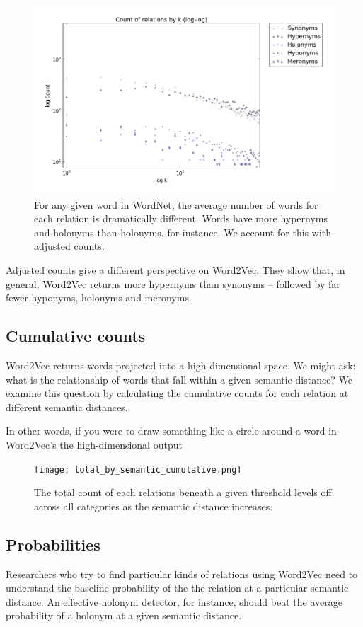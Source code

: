 \documentclass[titlepage]{article}
\begin{document}
\begin{figure}[!htbp]
  \includegraphics[scale=.5]{total_adjusted.png}
  \caption{For any given word in WordNet, the average number of words for each relation is dramatically different. Words have more hypernyms and holonyms than holonyms, for instance. We account for this with adjusted counts.}
  \label{fig:all_adjusted}
\end{figure}

Adjusted counts give a different perspective on Word2Vec. They show that, in general, Word2Vec returns more hypernyms than synonyms -- followed by far fewer hyponyms, holonyms and meronyms. 

\subsection{Cumulative counts} \label{binary}
Word2Vec returns words projected into a high-dimensional space. We might ask: what is the relationship of words that fall within a given semantic distance? We examine this question by calculating the cumulative counts for each relation at different semantic distances. 

In other words, if you were to draw something like a circle around a word in Word2Vec's the high-dimensional output 

\begin{figure}[!htbp]
  \centering
  \texttt{[image: total\_by\_semantic\_cumulative.png]}
  \captionsetup{justification=centering, margin=4cm }
  \caption{The total count of each relations beneath a given threshold levels off across all categories as the semantic distance increases.}
  \label{fig:all}
\end{figure}

\subsection{Probabilities}
Researchers who try to find particular kinds of relations using Word2Vec need to understand the baseline probability of the the relation at a particular semantic distance. An effective holonym detector, for instance, should beat the average probability of a holonym at a given semantic distance. 
\end{document}
